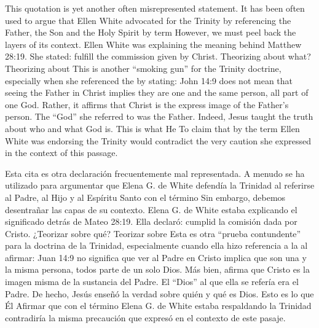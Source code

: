 This quotation is yet another often misrepresented statement. It has been often used to argue that Ellen White advocated for the Trinity by referencing the Father, the Son and the Holy Spirit by term  However, we must peel back the layers of its context. Ellen White was explaining the meaning behind Matthew 28:19. She stated:  fulfill the commission given by Christ. Theorizing about what? Theorizing about  This is another “smoking gun” for the Trinity doctrine, especially when she referenced the  by stating:  John 14:9 does not mean that seeing the Father in Christ implies they are one and the same person, all part of one God. Rather, it affirms that Christ is the express image of the Father’s person. The “God” she referred to was the Father. Indeed, Jesus taught the truth about who and what God is. This is what He   To claim that by the term  Ellen White was endorsing the Trinity would contradict the very caution she expressed in the context of this passage.


Esta cita es otra declaración frecuentemente mal representada. A menudo se ha utilizado para argumentar que Elena G. de White defendía la Trinidad al referirse al Padre, al Hijo y al Espíritu Santo con el término  Sin embargo, debemos desentrañar las capas de su contexto. Elena G. de White estaba explicando el significado detrás de Mateo 28:19. Ella declaró:  cumplid la comisión dada por Cristo. ¿Teorizar sobre qué? Teorizar sobre  Esta es otra “prueba contundente” para la doctrina de la Trinidad, especialmente cuando ella hizo referencia a la  al afirmar:  Juan 14:9 no significa que ver al Padre en Cristo implica que son una y la misma persona, todos parte de un solo Dios. Más bien, afirma que Cristo es la imagen misma de la sustancia del Padre. El “Dios” al que ella se refería era el Padre. De hecho, Jesús enseñó la verdad sobre quién y qué es Dios. Esto es lo que Él   Afirmar que con el término  Elena G. de White estaba respaldando la Trinidad contradiría la misma precaución que expresó en el contexto de este pasaje.


